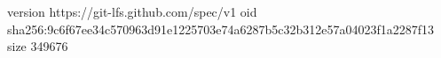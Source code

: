 version https://git-lfs.github.com/spec/v1
oid sha256:9c6f67ee34c570963d91e1225703e74a6287b5c32b312e57a04023f1a2287f13
size 349676
